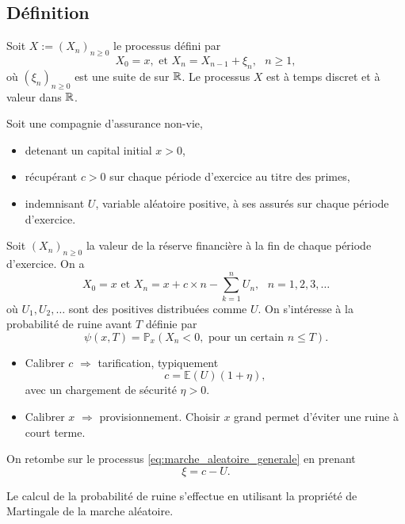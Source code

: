 \subsection{Définition}\label{ssec:definition}
Soit $X:= (X_n)_{n\geq0}$ le processus défini par 
\begin{equation}\label{eq:marche_aleatoire_generale}
X_0 = x,\text{ et }X_n = X_{n-1}+\xi_n,\text{ }n\geq 1,
\end{equation}
où $(\xi_n)_{n\geq0}$ est une suite de \va \iid sur $\mathbb{R}$. Le processus $X$ est à temps discret et à valeur dans $\mathbb{R}$.
\begin{ex}\label{ex:ruine_discret}
Soit une compagnie d'assurance non-vie,
\begin{itemize}
\item detenant un capital initial $x>0$,
\item récupérant $c>0$ sur chaque période d'exercice au titre des primes,
\item indemnisant $U$, variable aléatoire positive, à ses assurés sur chaque période d'exercice.
\end{itemize}
Soit $(X_n)_{n\geq0}$ la valeur de la réserve financière à la fin de chaque période d'exercice. On a
$$
X_0=x\text{ et }X_n=x+c\times n - \sum_{k=1}^{n}U_n,\text{ }n=1,2,3,\ldots
$$
où $U_1,U_2,\ldots$ sont des \va \iid positives distribuées comme $U$. On s'intéresse à la probabilité de ruine avant $T$ définie par
$$
\psi(x,T)=\mathbb{P}_x(X_n<0,\text{ pour un certain }n\leq T).
$$
\begin{itemize}
\item Calibrer $c$ $\Rightarrow$ tarification, typiquement
$$
c=\mathbb{E}(U)(1+\eta),
$$
avec un chargement de sécurité $\eta>0$.
\item Calibrer $x$ $\Rightarrow$ provisionnement. Choisir $x$ grand permet d'éviter une ruine à court terme.
\end{itemize}
On retombe sur le processus \eqref{eq:marche_aleatoire_generale} en prenant 
$$
\xi = c - U.
$$
\end{ex}
Le calcul de la probabilité de ruine s'effectue en utilisant la propriété de Martingale de la marche aléatoire. 
